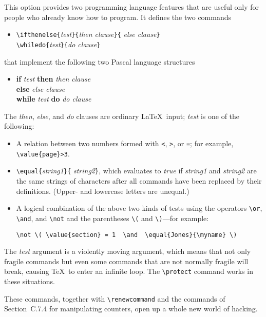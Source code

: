 This option provides two programming language features that are useful
only for people who already know how to program.  It defines the
two commands
\begin{itemize} 
\item[]
\verb|\ifthenelse{|{\em test\/}\verb|}{|{\em then clause\/}\verb|}{|%
{\em else clause\/}\verb|}|\\
\verb|\whiledo{|{\em test\/}\verb|}{|{\em do clause\/}\verb|}|
\end{itemize}
that implement the following two Pascal language structures
\begin{itemize}
\item[]
\begin{tabbing}
{\bf if} {\em test\/} \= {\bf then} \= {\em then clause\/} \\
 \> {\bf else} \> {\em else clause\/} \\[2pt]
{\bf while} {\em test\/} {\bf do} {\em do clause\/}
\end{tabbing}
\end{itemize}
The {\em then\/}, {\em else\/}, and {\em do\/} clauses
are ordinary \LaTeX\ input; {\em test\/} is one of the following:
\begin{itemize}
 \item A relation between two numbers formed with {\tt <}, {\tt >},
or {\tt =}; for example, \hbox{\verb|\value{page}>3|}.
 \item \verb|\equal{|{\em string1\/}\verb|}{|%
{\em string2\/}\verb|}|, which evaluates to {\em true\/} if {\em
string1\/} and {\em string2\/} are the same strings of characters after
all commands have been replaced by their definitions.  (Upper- and
lowercase letters are unequal.)
 \item A logical combination of the above two kinds of tests
    using the operators \hbox{\verb|\or|}, \hbox{\verb|\and|},
    and \hbox{\verb|\not|} and the parentheses \hbox{\verb|\(|}
    and \hbox{\verb|\)|}---for example:
\begin{verbatim}
\not \( \value{section} = 1  \and  \equal{Jones}{\myname} \)
\end{verbatim}
\end{itemize}
The {\em test\/} argument is a violently moving argument, which means
that not only fragile commands but even some commands that are not
normally fragile will break, causing \TeX\ to enter an infinite loop.
The \verb|\protect| command works in these situations.

These commands, together with \hbox{\verb|\renewcommand|} and the
commands of Section~C.7.4 for manipulating counters, open up a whole
new world of hacking.


